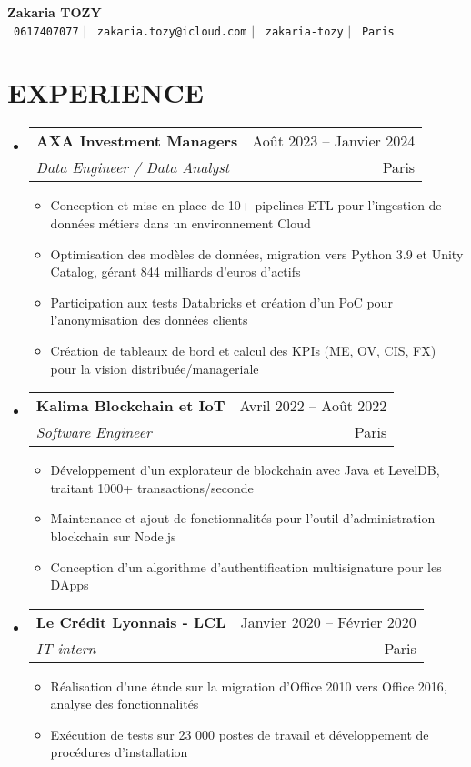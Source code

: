 \documentclass[letterpaper,11pt]{article}
\makeatletter
\newcommand{\resumeItem}[1]{
  \item\small{
    {#1 \vspace{-1pt}}
  }
}
\newcommand{\resumeSubheading}[4]{
  \vspace{-1pt}\item
    \begin{tabular*}{\textwidth}[t]{l@{\extracolsep{\fill}}r}
      \textbf{#1} & {\color{dark-grey}\small #2}\vspace{1pt}\\
      \textit{#3} & {\color{dark-grey} \small #4}\\
    \end{tabular*}\vspace{-4pt}
}
\newcommand{\resumeSubHeadingListStart}{\begin{itemize}[leftmargin=0in, label={}]}
\newcommand{\resumeSubHeadingListEnd}{\end{itemize}}
\newcommand{\resumeItemListStart}{\begin{itemize}[label={\textbullet}]}
\newcommand{\resumeItemListEnd}{\end{itemize}\vspace{0pt}}
\makeatother
\begin{document}
\begin{center}
    \textbf{\Huge Zakaria TOZY} \\ \vspace{5pt}
    \small \faPhone\ \texttt{0617407077} \hspace{1pt} $|$
    \hspace{1pt} \faEnvelope\ \texttt{zakaria.tozy@icloud.com} \hspace{1pt} $|$
    \hspace{1pt} \faLinkedin\ \texttt{zakaria-tozy} \hspace{1pt} $|$
    \hspace{1pt} \faMapMarker\ \texttt{Paris}
    \\ \vspace{-3pt}
\end{center}

\section{EXPERIENCE}
\resumeSubHeadingListStart
    \resumeSubheading
      {AXA Investment Managers}{Ao\^ut 2023 -- Janvier 2024}
      {Data Engineer / Data Analyst}{Paris}
      \resumeItemListStart
        \resumeItem{Conception et mise en place de 10+ pipelines ETL pour l'ingestion de donn\'ees m\'etiers dans un environnement Cloud}
        \resumeItem{Optimisation des mod\`eles de donn\'ees, migration vers Python 3.9 et Unity Catalog, g\'erant 844 milliards d'euros d'actifs}
        \resumeItem{Participation aux tests Databricks et cr\'eation d'un PoC pour l'anonymisation des donn\'ees clients}
        \resumeItem{Cr\'eation de tableaux de bord et calcul des KPIs (ME, OV, CIS, FX) pour la vision distribu\'ee/manageriale}
      \resumeItemListEnd
    \resumeSubheading
      {Kalima Blockchain et IoT}{Avril 2022 -- Ao\^ut 2022}
      {Software Engineer}{Paris}
      \resumeItemListStart
        \resumeItem{D\'eveloppement d'un explorateur de blockchain avec Java et LevelDB, traitant 1000+ transactions/seconde}
        \resumeItem{Maintenance et ajout de fonctionnalit\'es pour l'outil d'administration blockchain sur Node.js}
        \resumeItem{Conception d'un algorithme d'authentification multisignature pour les DApps}
      \resumeItemListEnd
    \resumeSubheading
      {Le Cr\'edit Lyonnais - LCL}{Janvier 2020 -- F\'evrier 2020}
      {IT intern}{Paris}
      \resumeItemListStart
        \resumeItem{R\'ealisation d'une \'etude sur la migration d'Office 2010 vers Office 2016, analyse des fonctionnalit\'es}
        \resumeItem{Ex\'ecution de tests sur 23 000 postes de travail et d\'eveloppement de proc\'edures d'installation}
      \resumeItemListEnd
  \resumeSubHeadingListEnd
\end{document}
